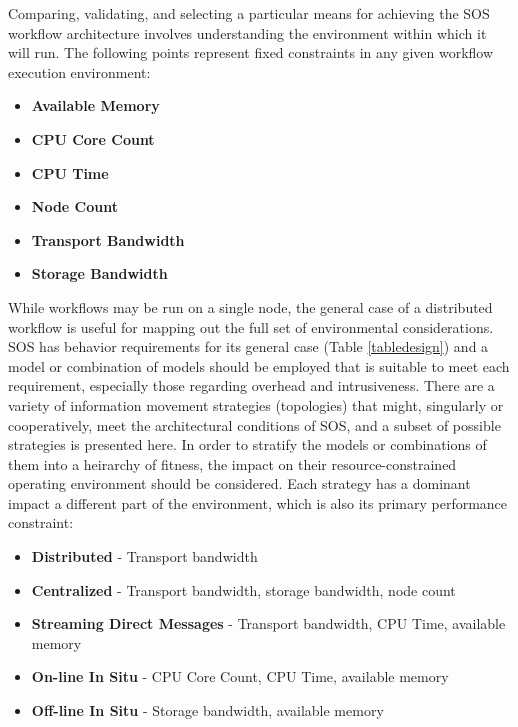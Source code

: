 Comparing, validating, and selecting a particular means for achieving
the SOS workflow architecture involves understanding the environment
within which it will run.
%
The following points represent fixed constraints in any given
workflow execution environment:
%
\begin{itemize}
    \item \textbf{Available Memory}
    \item \textbf{CPU Core Count}
    \item \textbf{CPU Time}
    \item \textbf{Node Count}
    \item \textbf{Transport Bandwidth}
    \item \textbf{Storage Bandwidth}
\end{itemize}
%
While workflows may be run on a single node, the general case of a
distributed workflow is useful for mapping out the full set of
environmental considerations.
%
SOS has behavior requirements for its general case (Table
\ref{tabledesign}) and a model or combination of models should
be employed that is suitable to meet each requirement,
especially those regarding overhead and intrusiveness.
%
There are a variety of information movement strategies (topologies)
that might, singularly or cooperatively, meet the architectural
conditions of SOS, and a subset of possible strategies is presented
here.
%
In order to stratify the models or combinations of them into a
heirarchy of fitness, the impact on their resource-constrained
operating environment should be considered.
%
Each strategy has a dominant impact a different part of the
environment, which is also its primary performance constraint:
%
\begin{itemize}
    \item \textbf{Distributed} - Transport bandwidth
    \item \textbf{Centralized} - Transport bandwidth, storage bandwidth, node count
    \item \textbf{Streaming Direct Messages} - Transport bandwidth, CPU Time, available memory
    \item \textbf{On-line In Situ} - CPU Core Count, CPU Time, available memory
    \item \textbf{Off-line In Situ} - Storage bandwidth, available memory
\end{itemize}
%

%




